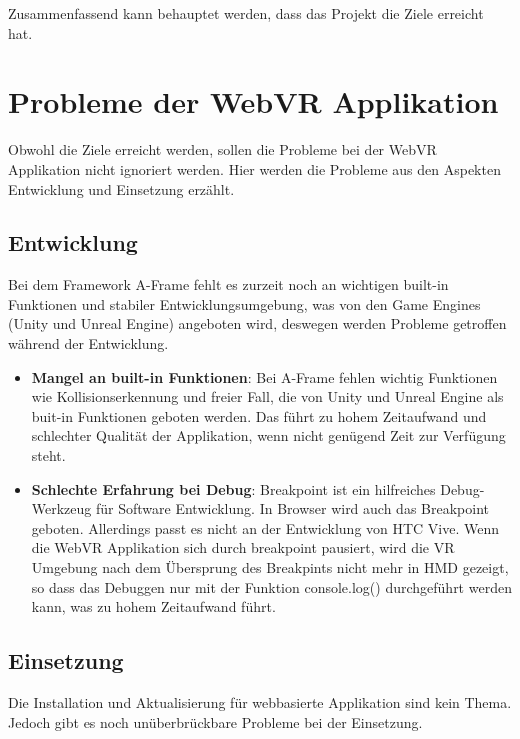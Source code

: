 Zusammenfassend kann behauptet werden, dass das Projekt die Ziele erreicht hat.

\section{Probleme der WebVR Applikation}
Obwohl die Ziele erreicht werden, sollen die Probleme bei der WebVR Applikation nicht ignoriert werden. Hier werden die Probleme aus den Aspekten Entwicklung und Einsetzung erzählt.

\subsection{Entwicklung}

Bei dem Framework A-Frame fehlt es zurzeit noch an wichtigen built-in Funktionen und stabiler Entwicklungsumgebung, was von den Game Engines (Unity und Unreal Engine) angeboten wird, deswegen werden Probleme getroffen während der Entwicklung. 

\begin{itemize}
    \item \textbf{Mangel an built-in Funktionen}: Bei A-Frame fehlen wichtig Funktionen wie Kollisionserkennung und freier Fall, die von Unity und Unreal Engine als buit-in Funktionen geboten werden. Das führt zu hohem Zeitaufwand und schlechter Qualität der Applikation, wenn nicht genügend Zeit zur Verfügung steht.
    
    \item \textbf{Schlechte Erfahrung bei Debug}: Breakpoint ist ein hilfreiches Debug-Werkzeug für Software Entwicklung. In Browser wird auch das Breakpoint geboten. Allerdings passt es nicht an der Entwicklung von HTC Vive. Wenn die WebVR Applikation sich durch breakpoint pausiert, wird die VR Umgebung nach dem Übersprung des Breakpints nicht mehr in HMD gezeigt, so dass das Debuggen nur mit der Funktion {\selectfont console.log()} durchgeführt werden kann, was zu hohem Zeitaufwand führt.
    
\end{itemize}

\subsection{Einsetzung}

Die Installation und Aktualisierung für webbasierte Applikation sind kein Thema. Jedoch gibt es noch unüberbrückbare Probleme bei der Einsetzung.

